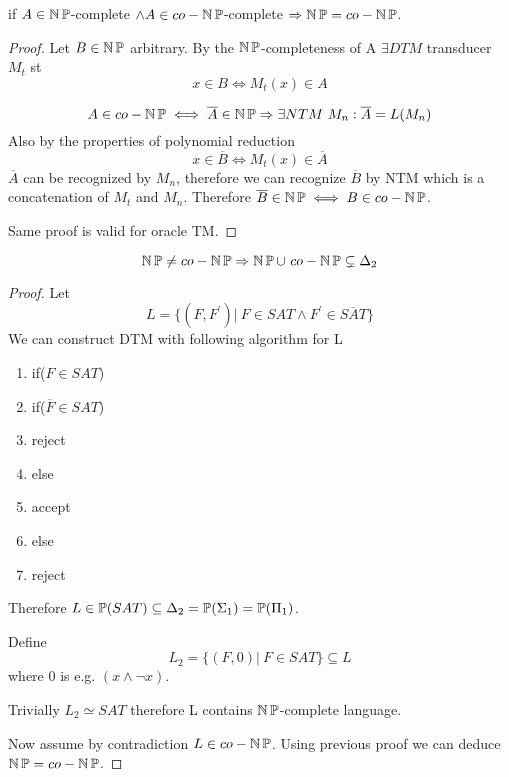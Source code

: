 \begin{theorem}[NP = co-NP]
	if $A \in \operatorname{\operatorname{\mathbb{N}}\mathbb{P}}$-complete $\land A \in co-\operatorname{\operatorname{\mathbb{N}}\mathbb{P}}$-complete $\Rightarrow \operatorname{\operatorname{\mathbb{N}}\mathbb{P}} = co-\operatorname{\operatorname{\mathbb{N}}\mathbb{P}}$.
\end{theorem}
\begin{proof}
	Let $B \in \operatorname{\operatorname{\mathbb{N}}\mathbb{P}}$ arbitrary.
	By the $\operatorname{\operatorname{\mathbb{N}}\mathbb{P}}$-completeness of A $\exists DTM$ transducer $M_t$ st
	\[ x \in B \iff M_t(x) \in A \]

	\[ A \in co-\operatorname{\operatorname{\mathbb{N}}\mathbb{P}} \iff \overline{A} \in \operatorname{\operatorname{\mathbb{N}}\mathbb{P}} \Rightarrow \exists NTM\ M_n: \overline{A} = L(M_n) \]
	Also by the properties of polynomial reduction
	\[ x \in \overline{B} \iff M_t(x) \in \overline{A} \]
	$\overline{A}$ can be recognized by $M_n$, therefore we can recognize $\overline{B}$ by NTM which is a concatenation of $M_t$ and $M_n$.
	Therefore $\overline{B} \in \operatorname{\operatorname{\mathbb{N}}\mathbb{P}} \iff B \in co-\operatorname{\operatorname{\mathbb{N}}\mathbb{P}} $.

	Same proof is valid for oracle TM.
\end{proof}

\begin{theorem}[NP $\neq$ co-NP]
	\[ \TNP \ne co-\TNP \Rightarrow \TNP \cup\ co-\TNP \subsetneq \Delta_2 \]
\end{theorem}
\begin{proof}
	Let
	\[ L = \{ (F, F^{\prime}) |\ F \in SAT \land F^{\prime} \in \overline{SAT} \} \]
	We can construct DTM with following algorithm for L

	\begin{enumerate}
		\item if($F \in SAT$)
		\item \tab if($\overline{F} \in SAT$)
		\item \tab \tab reject
		\item \tab else
		\item \tab \tab accept
		\item else
		\item \tab reject
	\end{enumerate}

	Therefore $L \in \operatorname{\mathbb{P}}(SAT) \subseteq \Delta_2 = \operatorname{\mathbb{P}}(\Sigma_1) = \operatorname{\mathbb{P}}(\Pi_1)$.

	Define
	\[ L_2 = \{ (F, 0)|\ F \in SAT \} \subseteq L \]
	where $0$ is e.g. $(x \land \neg x)$.

	Trivially $ L_2 \simeq SAT$ therefore L contains $\operatorname{\operatorname{\mathbb{N}}\mathbb{P}}$-complete language.

	Now assume by contradiction $L \in co-\operatorname{\operatorname{\mathbb{N}}\mathbb{P}}$.
	Using previous proof we can deduce $\operatorname{\operatorname{\mathbb{N}}\mathbb{P}} = co-\operatorname{\operatorname{\mathbb{N}}\mathbb{P}}$.
\end{proof}

